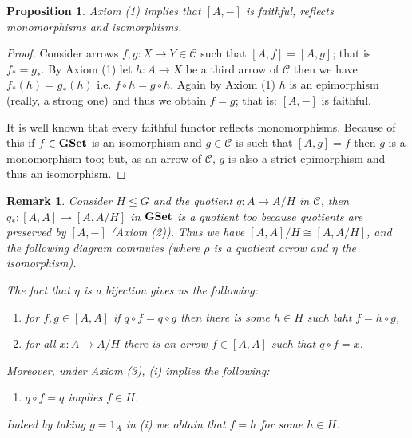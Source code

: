 \documentclass[italian, 12pt, reqno]{article}
\theoremstyle{myteo}
\newtheorem{proposition}[theorem]{Proposition}
\newtheorem{remark}[theorem]{Remark}
\numberwithin{equation}{section}
\newcommand{\cat}[1]{\mathscr{#1}}
\newcommand{\gset}{\text{\textbf{GSet}}}
\newcommand{\homs}[2]{[#1, #2]}
\newcommand{\fun}[3]{#1\colon#2\to #3}
\begin{document}
\begin{proposition}
  \label{prop:hom_is_faithful}
  Axiom (1) implies that \(\homs{A}{-}\) is faithful, reflects monomorphisms and isomorphisms.
\end{proposition}

\begin{proof}
  Consider arrows \(\fun{f,g}{X}{Y}\in\cat{C}\) such that \(\homs{A}{f} = \homs{A}{g}\); that is \(f_* = g_*\).
  By Axiom (1) let \(\fun{h}{A}{X}\) be a third arrow of \(\cat{C}\) then we have \(f_*(h) = g_*(h)\) i.e. \(f\circ h = g\circ h\).
  Again by Axiom (1) \(h\) is an epimorphism (really, a strong one) and thus we obtain \(f = g\); that is: \(\homs{A}{-}\) is faithful.
  
  It is well known that every faithful functor reflects monomorphisms.
  Because of this if \(f\in\gset\) is an isomorphism and \(g\in\cat{C}\) is such that \(\homs{A}{g} = f\) then \(g\) is a monomorphism too; but, as an arrow of \(\cat{C}\), \(g\) is also a strict epimorphism and thus an isomorphism.
\end{proof}

\begin{remark}
  \label{rem:axiom1}
  Consider \(H\leq G\) and the quotient \(\fun{q}{A}{A/H}\) in \(\cat{C}\), then \(\fun{q_*}{\homs{A}{A}}{\homs{A}{A/H}}\) in \(\gset\) is a quotient too because quotients are preserved by \(\homs{A}{-}\) (Axiom (2)).
  Thus we have \(\homs{A}{A}/H \cong \homs{A}{A/H}\), and the following diagram commutes (where \(\rho\) is a quotient arrow and \(\eta\) the isomorphism).

  \begin{figure}
    \begin{center}
    \end{center}
    \caption{}
    \label{diagram:eta}
  \end{figure}

  The fact that \(\eta\) is a bijection gives us the following:
  \begin{enumerate}
  \item[(i)] for \(f, g\in \homs{A}{A}\) if \(q\circ f = q\circ g\) then there is some \(h\in H\) such taht \(f = h\circ g\),
  \item[(ii)] for all \(\fun{x}{A}{A/H}\) there is an arrow \(f\in\homs{A}{A}\) such that \(q\circ f = x\).
  \end{enumerate}
  Moreover, under Axiom (3), (i) implies the following:
  \begin{enumerate}
  \item[(iii)] \(q\circ f = q\) implies \(f\in H\).
  \end{enumerate}
  Indeed by taking \(g = 1_A\) in (i) we obtain that \(f = h\) for some \(h\in H\).
\end{remark}
\end{document}
